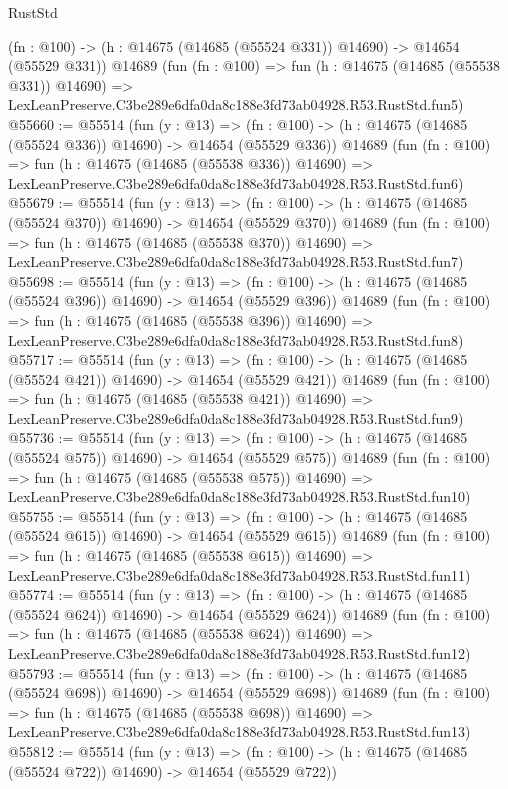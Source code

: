 \begin{lexlean}{RustStd}
\begin{coremodule}
    (fn : @100) -> (h : @14675 (@14685 (@55524 @331)) @14690) -> @14654 (@55529 @331))
    @14689
    (fun (fn : @100) =>
    fun (h : @14675 (@14685 (@55538 @331)) @14690) =>
    LexLeanPreserve.C3be289e6dfa0da8c188e3fd73ab04928.R53.RustStd.fun5)
@55660 := @55514
    (fun (y : @13) =>
    (fn : @100) -> (h : @14675 (@14685 (@55524 @336)) @14690) -> @14654 (@55529 @336))
    @14689
    (fun (fn : @100) =>
    fun (h : @14675 (@14685 (@55538 @336)) @14690) =>
    LexLeanPreserve.C3be289e6dfa0da8c188e3fd73ab04928.R53.RustStd.fun6)
@55679 := @55514
    (fun (y : @13) =>
    (fn : @100) -> (h : @14675 (@14685 (@55524 @370)) @14690) -> @14654 (@55529 @370))
    @14689
    (fun (fn : @100) =>
    fun (h : @14675 (@14685 (@55538 @370)) @14690) =>
    LexLeanPreserve.C3be289e6dfa0da8c188e3fd73ab04928.R53.RustStd.fun7)
@55698 := @55514
    (fun (y : @13) =>
    (fn : @100) -> (h : @14675 (@14685 (@55524 @396)) @14690) -> @14654 (@55529 @396))
    @14689
    (fun (fn : @100) =>
    fun (h : @14675 (@14685 (@55538 @396)) @14690) =>
    LexLeanPreserve.C3be289e6dfa0da8c188e3fd73ab04928.R53.RustStd.fun8)
@55717 := @55514
    (fun (y : @13) =>
    (fn : @100) -> (h : @14675 (@14685 (@55524 @421)) @14690) -> @14654 (@55529 @421))
    @14689
    (fun (fn : @100) =>
    fun (h : @14675 (@14685 (@55538 @421)) @14690) =>
    LexLeanPreserve.C3be289e6dfa0da8c188e3fd73ab04928.R53.RustStd.fun9)
@55736 := @55514
    (fun (y : @13) =>
    (fn : @100) -> (h : @14675 (@14685 (@55524 @575)) @14690) -> @14654 (@55529 @575))
    @14689
    (fun (fn : @100) =>
    fun (h : @14675 (@14685 (@55538 @575)) @14690) =>
    LexLeanPreserve.C3be289e6dfa0da8c188e3fd73ab04928.R53.RustStd.fun10)
@55755 := @55514
    (fun (y : @13) =>
    (fn : @100) -> (h : @14675 (@14685 (@55524 @615)) @14690) -> @14654 (@55529 @615))
    @14689
    (fun (fn : @100) =>
    fun (h : @14675 (@14685 (@55538 @615)) @14690) =>
    LexLeanPreserve.C3be289e6dfa0da8c188e3fd73ab04928.R53.RustStd.fun11)
@55774 := @55514
    (fun (y : @13) =>
    (fn : @100) -> (h : @14675 (@14685 (@55524 @624)) @14690) -> @14654 (@55529 @624))
    @14689
    (fun (fn : @100) =>
    fun (h : @14675 (@14685 (@55538 @624)) @14690) =>
    LexLeanPreserve.C3be289e6dfa0da8c188e3fd73ab04928.R53.RustStd.fun12)
@55793 := @55514
    (fun (y : @13) =>
    (fn : @100) -> (h : @14675 (@14685 (@55524 @698)) @14690) -> @14654 (@55529 @698))
    @14689
    (fun (fn : @100) =>
    fun (h : @14675 (@14685 (@55538 @698)) @14690) =>
    LexLeanPreserve.C3be289e6dfa0da8c188e3fd73ab04928.R53.RustStd.fun13)
@55812 := @55514
    (fun (y : @13) =>
    (fn : @100) -> (h : @14675 (@14685 (@55524 @722)) @14690) -> @14654 (@55529 @722))

\end{coremodule}
\end{lexlean}

